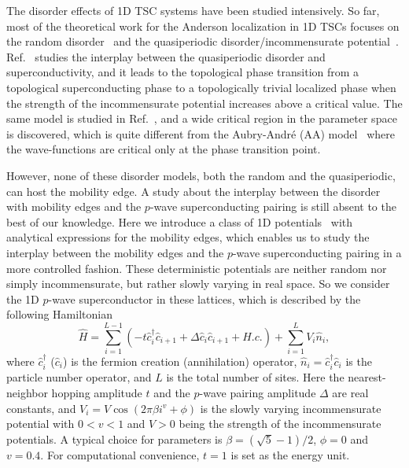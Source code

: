 \documentclass[prb,showpacs,twocolumn,aps,superscriptaddress,a4paper]{revtex4-1}
\begin{document}
The disorder effects of 1D TSC systems have been studied intensively. So far, most of the theoretical work for the Anderson localization in 1D
TSCs focuses on the random disorder~\cite{B10,G11,L12,B13} and the quasiperiodic disorder/incommensurate potential~\cite{14PRL,15PRB,liu,zhou,he,Gramsch,16A}. Ref.~\cite{14PRL} studies the interplay between the quasiperiodic disorder and superconductivity, and it leads to the topological phase transition from a topological superconducting phase to a topologically trivial localized phase when the strength of the incommensurate potential increases above a critical value. The same model is studied in Ref.~\cite{15PRB}, and a wide critical region in the parameter space is discovered, which is quite different from the Aubry-Andr\'{e} (AA) model~\cite{16A} where the wave-functions are critical only at the phase transition point.

However, none of these disorder models, both the random and the quasiperiodic, can host the mobility edge. A study about the interplay between the disorder with mobility edges and the $p$-wave superconducting pairing is still absent to the best of our knowledge. Here we introduce a class of 1D potentials~\cite{thou17,sarma18} with analytical expressions for the mobility edges, which enables us to study the interplay between the mobility edges and the $p$-wave superconducting pairing in a more controlled fashion. These deterministic potentials are neither random nor simply incommensurate, but rather slowly varying in real space. So we consider the 1D $p$-wave superconductor in these lattices, which is described by the following Hamiltonian
\begin{equation}\label{tb1}
    \hat H=\sum_{i=1}^{L-1}(-t \hat{c}_{i}^{\dag } \hat{c}_{i+1}+ \Delta \hat{c}_{i} \hat{c}_{i+1}+ H.c.)+\sum_{i=1}^{L}V_{i} \hat{n}_{i},
\end{equation}
where $\hat{c}^\dagger_i$ ($\hat{c}_i$) is the fermion creation
(annihilation) operator, $\hat{n}_i=\hat{c}^\dagger_{i}\hat{c}_{i}$ is the particle number operator,
and $L$ is the total number of sites. Here the nearest-neighbor
hopping amplitude $t$ and the $p$-wave pairing amplitude $\Delta$
are real constants, and $V_{i}=V\cos(2\pi\beta{i^{v}}+\phi)$ is the slowly varying incommensurate potential with $0<v<1$ and $V>0$ being the strength of the incommensurate potentials. A typical choice for parameters is $\beta=(\sqrt{5}-1)/2$, $\phi = 0$ and $v=0.4$. For computational convenience, $t = 1$ is set as the energy unit.
\end{document}
